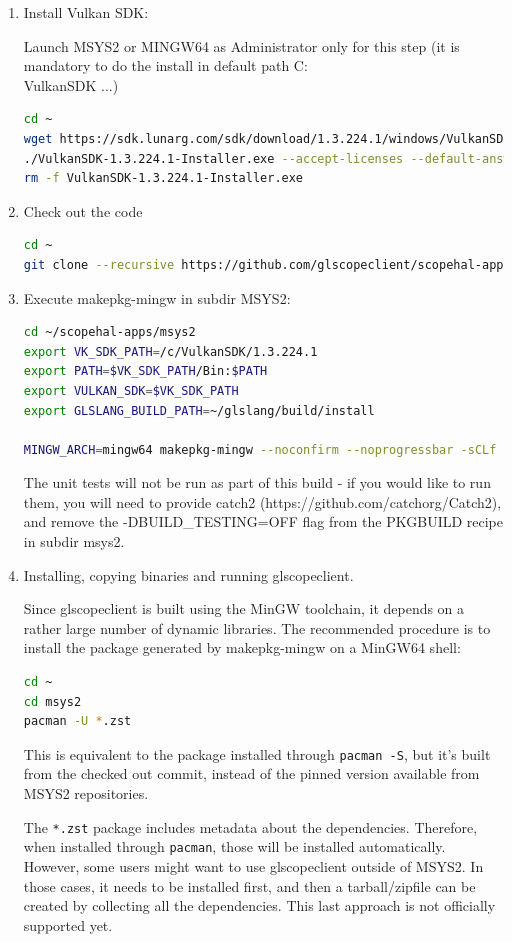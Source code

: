 \begin{enumerate}
\item Install Vulkan SDK:

Launch MSYS2 or MINGW64 as Administrator only for this step (it is mandatory to do the install in default path C:\\VulkanSDK ...)
\begin{lstlisting}[language=sh, numbers=none]
cd ~
wget https://sdk.lunarg.com/sdk/download/1.3.224.1/windows/VulkanSDK-1.3.224.1-Installer.exe
./VulkanSDK-1.3.224.1-Installer.exe --accept-licenses --default-answer --confirm-command install
rm -f VulkanSDK-1.3.224.1-Installer.exe
\end{lstlisting}

\item Check out the code

\begin{lstlisting}[language=sh, numbers=none]
cd ~
git clone --recursive https://github.com/glscopeclient/scopehal-apps
\end{lstlisting}

\item Execute makepkg-mingw in subdir MSYS2:

\begin{lstlisting}[language=sh, numbers=none]
cd ~/scopehal-apps/msys2
export VK_SDK_PATH=/c/VulkanSDK/1.3.224.1
export PATH=$VK_SDK_PATH/Bin:$PATH
export VULKAN_SDK=$VK_SDK_PATH
export GLSLANG_BUILD_PATH=~/glslang/build/install

MINGW_ARCH=mingw64 makepkg-mingw --noconfirm --noprogressbar -sCLf
\end{lstlisting}

The unit tests will not be run as part of this build - if you would like to run them, you will need to provide catch2
(https://github.com/catchorg/Catch2), and remove the -DBUILD\_TESTING=OFF flag from the PKGBUILD recipe in subdir
msys2.

\item Installing, copying binaries and running glscopeclient.

Since glscopeclient is built using the MinGW toolchain, it depends on a rather large number of dynamic libraries.
The recommended procedure is to install the package generated by makepkg-mingw on a MinGW64 shell:

\begin{lstlisting}[language=sh, numbers=none]
cd ~
cd msys2
pacman -U *.zst
\end{lstlisting}

This is equivalent to the package installed through \lstinline{pacman -S}, but it's built from the checked out commit,
instead of the pinned version available from MSYS2 repositories.

The \lstinline{*.zst} package includes metadata about the dependencies.
Therefore, when installed through \lstinline{pacman}, those will be installed automatically.
However, some users might want to use glscopeclient outside of MSYS2.
In those cases, it needs to be installed first, and then a tarball/zipfile can be created by collecting all the dependencies.
This last approach is not officially supported yet.

\end{enumerate}

